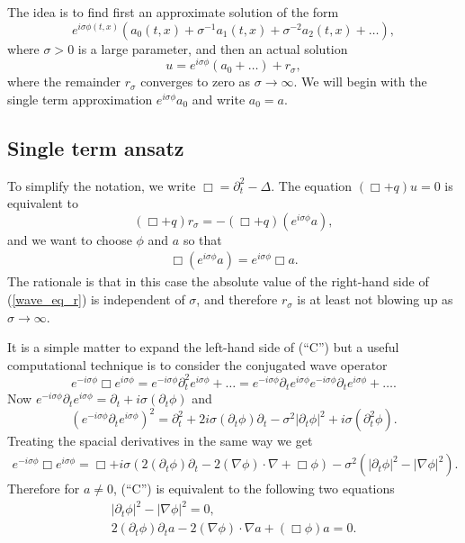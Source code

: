 \documentclass[12pt,oneside,final]{amsart}
\def\p{\partial}
\begin{document}
The idea is to find first an approximate solution of the form 
$$
e^{i \sigma \phi(t,x)} (a_0(t,x) + \sigma^{-1} a_1(t,x) + \sigma^{-2} a_2(t,x) + \dots), 
$$
where $\sigma > 0$ is a large parameter, 
and then an actual solution 
$$
u = e^{i \sigma \phi} (a_0 + \dots) + r_\sigma,
$$ 
where the remainder $r_\sigma$ converges to zero as $\sigma \to \infty$.
We will begin with the single term approximation $e^{i \sigma \phi} a_0$ and write $a_0 = a$.

\subsection{Single term ansatz}

To simplify the notation, we write $\Box = \p_t^2 - \Delta$.
The equation $(\Box + q) u = 0$ is equivalent to
\begin{equation}\label{wave_eq_r}
(\Box + q) r_\sigma = - (\Box + q) (e^{i\sigma \phi} a),
\end{equation}
and we want to choose $\phi$ and $a$ so that 
\begin{align}\tag{``C''}
\Box (e^{i\sigma \phi} a) = e^{i\sigma \phi} \Box a.
\end{align}
The rationale is that in this case the absolute value of the right-hand side of (\ref{wave_eq_r}) is independent of $\sigma$, and therefore $r_\sigma$ is at least not blowing up as $\sigma \to \infty$.

It is a simple matter to expand the left-hand side of (``C'') but a useful computational technique is to consider the conjugated wave operator 
$$
e^{-i\sigma \phi} \Box e^{i\sigma \phi}
= e^{-i\sigma \phi} \p_t^2 e^{i\sigma \phi} + \dots
= e^{-i\sigma \phi} \p_t  e^{i\sigma \phi} e^{-i\sigma \phi} \p_t  e^{i\sigma \phi} + \dots.
$$
Now $e^{-i\sigma \phi} \p_t  e^{i\sigma \phi} = \p_t + i \sigma (\p_t\phi)$ and 
$$
(e^{-i\sigma \phi} \p_t e^{i\sigma \phi})^2
= \p_t^2 + 2 i \sigma (\p_t\phi) \p_t - \sigma^2 |\p_t \phi|^2 + i \sigma (\p_t^2 \phi).
$$
Treating the spacial derivatives in the same way we get 
\begin{align}\label{conjugation}
e^{-i\sigma \phi} \Box e^{i\sigma \phi} = 
\Box + i \sigma ( 2 (\p_t\phi) \p_t - 2 (\nabla \phi) \cdot \nabla + \Box \phi) - \sigma^2 (|\p_t \phi|^2 - |\nabla \phi|^2).
\end{align}
Therefore for $a \ne 0$, (``C'') is equivalent to the following two equations
\begin{align}
\tag{E}|\p_t \phi|^2 - |\nabla \phi|^2 = 0,
\\\tag{T}
2 (\p_t\phi) \p_t a - 2 (\nabla \phi) \cdot \nabla a + (\Box \phi) a = 0.
\end{align}
\end{document}
